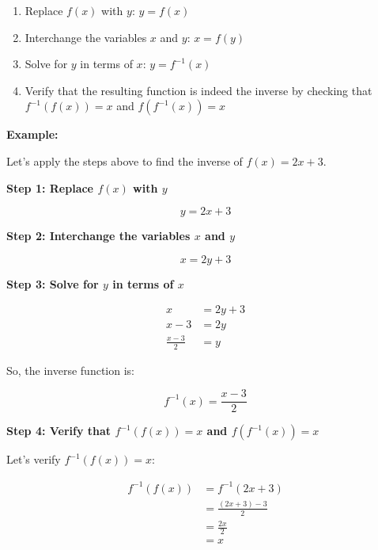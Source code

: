 \begin{enumerate}
	
	\item Replace \(f (x)\) with \(y\): \(y = f (x)\)
	
	\item Interchange the variables \(x\) and \(y\): \(x = f (y)\)
	
	\item Solve for \(y\) in terms of \(x\): \(y = f^{-1} (x)\)
	
	\item Verify that the resulting function is indeed the inverse by checking that \(f^{-1}(f(x)) = x\) 
		  and \(f (f^{-1} (x)) = x\)

		\end{enumerate}

\textbf{Example:}
\vspace{\baselineskip}

Let's apply the steps above to find the inverse of \(f (x) = 2x + 3\).
\vspace{\baselineskip}

\textbf{Step 1: Replace \(f (x)\) with \(y\)}

\[
	y = 2x + 3
\]

\textbf{Step 2: Interchange the variables \(x\) and \(y\)}

\[
	x = 2y + 3
\]

\textbf{Step 3: Solve for \(y\) in terms of \(x\)}

\begin{align*}
	x               & = 2y + 3 \\
	x - 3           & = 2y     \\
	\frac{x - 3}{2} & = y
\end{align*}

So, the inverse function is:

\[
	f^{-1}(x) = \frac{x - 3}{2}
\]

\textbf{Step 4: Verify that \(f^{-1} (f (x)) = x\) and \(f(f^{-1} (x)) = x\)}

Let's verify \(f^{-1} (f (x)) = x\):

\begin{align*}
	f^{-1}(f(x)) & = f^{-1}(2x + 3)         \\
	             & = \frac{(2x + 3) - 3}{2} \\
	             & = \frac{2x}{2}           \\
	             & = x
\end{align*}

